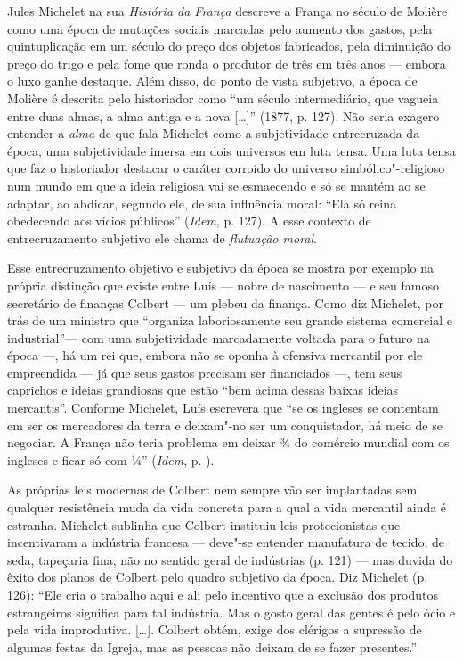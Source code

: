 Jules Michelet na sua \emph{História da França} descreve a França no
século de Molière como uma época de mutações sociais marcadas pelo
aumento dos gastos, pela quintuplicação em um século do preço dos
objetos fabricados, pela diminuição do preço do trigo e pela fome que
ronda o produtor de três em três anos --- embora o luxo ganhe destaque.
Além disso, do ponto de vista subjetivo, a época
de Molière é descrita pelo historiador como ``um século intermediário,
que vagueia entre duas almas, a alma antiga e a nova [\ldots{}]'' (1877,
p. 127). Não seria exagero entender a \emph{alma} de que fala Michelet
como a subjetividade entrecruzada da época, uma subjetividade imersa em
dois universos em luta tensa. Uma luta tensa que faz o historiador
destacar o caráter corroído do universo simbólico"-religioso num mundo em
que a ideia religiosa vai se esmaecendo e só se mantém ao se adaptar, ao
abdicar, segundo ele, de sua influência moral: ``Ela só reina obedecendo
aos vícios públicos'' (\emph{Idem}, p. 127). A esse contexto de
entrecruzamento subjetivo ele chama de \emph{flutuação moral}.

Esse entrecruzamento objetivo e subjetivo da época se mostra por exemplo
na própria distinção que existe entre Luís  --- nobre de nascimento ---
e seu famoso secretário de finanças Colbert --- um plebeu da finança.
Como diz Michelet, por trás de um ministro que ``organiza laboriosamente
seu grande sistema comercial e industrial''--- com uma subjetividade
marcadamente voltada para o futuro na época ---, há um rei que, embora
não se oponha à ofensiva mercantil por ele empreendida --- já que seus
gastos precisam ser financiados ---, tem seus caprichos e ideias
grandiosas que estão ``bem acima dessas baixas ideias mercantis''.
Conforme Michelet, Luís  escrevera que ``se os ingleses se contentam
em ser os mercadores da terra e deixam"-no ser um conquistador, há meio
de se negociar. A França não teria problema em deixar ¾ do comércio
mundial com os ingleses e ficar só com ¼'' (\emph{Idem}, p. ).

As próprias leis modernas de Colbert nem sempre vão ser implantadas sem
qualquer resistência muda da vida concreta para a qual a vida mercantil
ainda é estranha. Michelet sublinha que Colbert instituiu leis
protecionistas que incentivaram a indústria francesa --- deve"-se entender
manufatura de tecido, de seda, tapeçaria fina, não no sentido geral de
indústrias (p. 121) --- mas duvida do êxito dos planos de Colbert pelo
quadro subjetivo da época. Diz Michelet (p. 126): ``Ele cria o trabalho
aqui e ali pelo incentivo que a exclusão dos produtos estrangeiros
significa para tal indústria. Mas o gosto geral das gentes é pelo ócio e
pela vida improdutiva. [\ldots{}]. Colbert obtém, exige dos clérigos a
supressão de algumas festas da Igreja, mas as pessoas não deixam de se
fazer presentes.''

